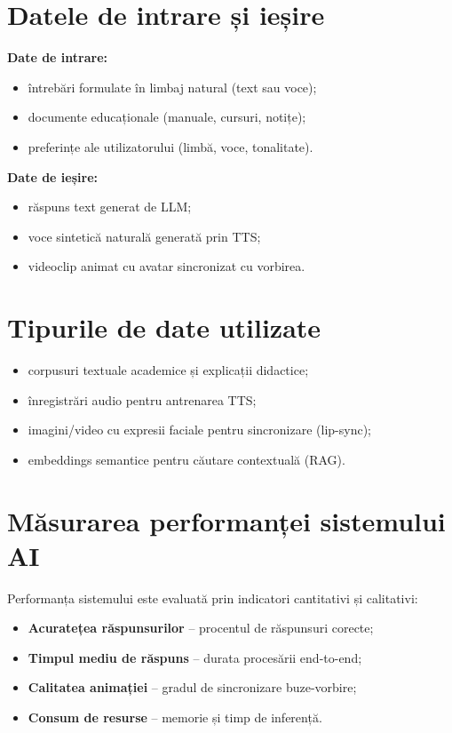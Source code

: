 \documentclass[12pt,a4paper]{report}
\begin{document}
\section{Datele de intrare și ieșire}
\textbf{Date de intrare:}
\begin{itemize}
  \item întrebări formulate în limbaj natural (text sau voce);
  \item documente educaționale (manuale, cursuri, notițe);
  \item preferințe ale utilizatorului (limbă, voce, tonalitate).
\end{itemize}

\textbf{Date de ieșire:}
\begin{itemize}
  \item răspuns text generat de LLM;
  \item voce sintetică naturală generată prin TTS;
  \item videoclip animat cu avatar sincronizat cu vorbirea.
\end{itemize}

\section{Tipurile de date utilizate}
\begin{itemize}
  \item corpusuri textuale academice și explicații didactice;
  \item înregistrări audio pentru antrenarea TTS;
  \item imagini/video cu expresii faciale pentru sincronizare (lip-sync);
  \item embeddings semantice pentru căutare contextuală (RAG).
\end{itemize}

\section{Măsurarea performanței sistemului AI}
Performanța sistemului este evaluată prin indicatori cantitativi și calitativi:
\begin{itemize}
  \item \textbf{Acuratețea răspunsurilor} – procentul de răspunsuri corecte;
  \item \textbf{Timpul mediu de răspuns} – durata procesării end-to-end;
  \item \textbf{Calitatea animației} – gradul de sincronizare buze-vorbire;
  \item \textbf{Consum de resurse} – memorie și timp de inferență.
\end{itemize}
\end{document}
